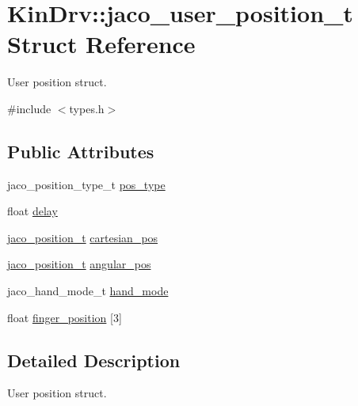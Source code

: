 \hypertarget{structKinDrv_1_1jaco__user__position__t}{\section{Kin\+Drv\+:\+:jaco\+\_\+user\+\_\+position\+\_\+t Struct Reference}
\label{structKinDrv_1_1jaco__user__position__t}
}


User position struct.  




{\ttfamily \#include $<$types.\+h$>$}

\subsection*{Public Attributes}
\begin{DoxyCompactItemize}
\item 
jaco\+\_\+position\+\_\+type\+\_\+t \hyperlink{structKinDrv_1_1jaco__user__position__t_ad97cb7bd9e3f277a77977f0dddb5b476}{pos\+\_\+type}
\item 
float \hyperlink{structKinDrv_1_1jaco__user__position__t_abfe11bcd4ead7fadfe5f4592c67650ef}{delay}
\item 
\hyperlink{structKinDrv_1_1jaco__position__t}{jaco\+\_\+position\+\_\+t} \hyperlink{structKinDrv_1_1jaco__user__position__t_a40ad642f7934033ee89b4666434e471f}{cartesian\+\_\+pos}
\item 
\hyperlink{structKinDrv_1_1jaco__position__t}{jaco\+\_\+position\+\_\+t} \hyperlink{structKinDrv_1_1jaco__user__position__t_af70be18891d0d8a4ff5dd4c83ea4e5ae}{angular\+\_\+pos}
\item 
jaco\+\_\+hand\+\_\+mode\+\_\+t \hyperlink{structKinDrv_1_1jaco__user__position__t_a5eb20d46dbbcf4b9638175f62985c77d}{hand\+\_\+mode}
\item 
float \hyperlink{structKinDrv_1_1jaco__user__position__t_a7fd9befb0c71c9b1de3a93c754fa79f2}{finger\+\_\+position} \mbox{[}3\mbox{]}
\end{DoxyCompactItemize}


\subsection{Detailed Description}
User position struct. 

